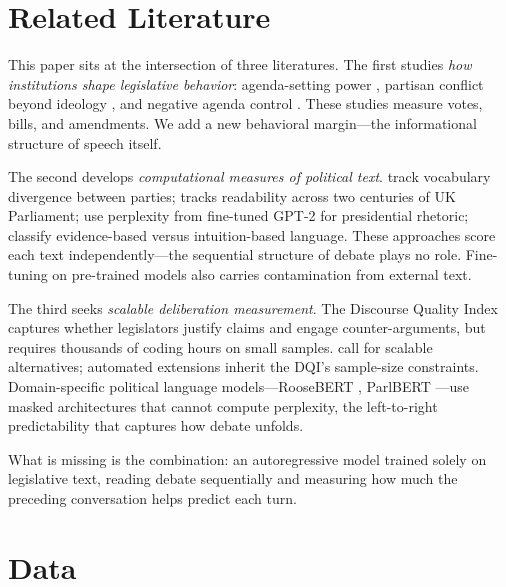 \documentclass[12pt]{article}
\begin{document}
\section{Related Literature}

This paper sits at the intersection of three literatures. The first studies \textit{how institutions shape legislative behavior}: agenda-setting power \citep{perssonTabellini2000, perssonTabellini2003}, partisan conflict beyond ideology \citep{lee2009}, and negative agenda control \citep{jenkins2006}. These studies measure votes, bills, and amendments. We add a new behavioral margin---the informational structure of speech itself.

The second develops \textit{computational measures of political text}. \citet{gentzkow2019} track vocabulary divergence between parties; \citet{spirling2016} tracks readability across two centuries of UK Parliament; \citet{zhou2024} use perplexity from fine-tuned GPT-2 for presidential rhetoric; \citet{aroyehun2025} classify evidence-based versus intuition-based language. These approaches score each text independently---the sequential structure of debate plays no role. Fine-tuning on pre-trained models also carries contamination from external text.

The third seeks \textit{scalable deliberation measurement}. The Discourse Quality Index \citep{steiner2004} captures whether legislators justify claims and engage counter-arguments, but requires thousands of coding hours on small samples. \citet{bachtiger2019} call for scalable alternatives; automated extensions \citep{fournierTombs2021, flores2024} inherit the DQI's sample-size constraints. Domain-specific political language models---RooseBERT \citep{evrard2025}, ParlBERT \citep{klamm2022}---use masked architectures that cannot compute perplexity, the left-to-right predictability that captures how debate unfolds.

What is missing is the combination: an autoregressive model trained solely on legislative text, reading debate sequentially and measuring how much the preceding conversation helps predict each turn.


\section{Data}
\end{document}
